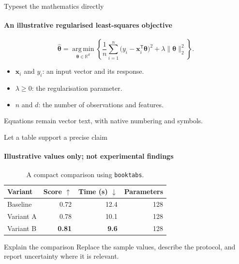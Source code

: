 \documentclass[aspectratio=169,11pt,t]{beamer}
\begin{document}
\begin{frame}{Typeset the mathematics directly}
  \framesubtitle{An illustrative regularised least-squares objective}
  \begin{equation}
    \widehat{\boldsymbol{\theta}}
      = \operatorname*{arg\,min}_{\boldsymbol{\theta}\in\mathbb{R}^{d}}
      \left\{
        \frac{1}{n}\sum_{i=1}^{n}
        \bigl(y_i-\mathbf{x}_i^{\mathsf T}\boldsymbol{\theta}\bigr)^2
        + \lambda\lVert\boldsymbol{\theta}\rVert_2^2
      \right\}.
  \end{equation}
  \begin{itemize}
    \item $\mathbf{x}_i$ and $y_i$: an input vector and its response.
    \item $\lambda\geq0$: the regularisation parameter.
    \item $n$ and $d$: the number of observations and features.
  \end{itemize}
  \smallskip
  {\small Equations remain vector text, with native numbering and symbols.}
\end{frame}

\begin{frame}{Let a table support a precise claim}
  \framesubtitle{Illustrative values only; not experimental findings}
  \begin{table}
    \centering
    \renewcommand{\arraystretch}{1.2}
    \begin{tabular}{lrrr}
      \toprule
      Variant & Score $\uparrow$ & Time (s) $\downarrow$ & Parameters \\
      \midrule
      Baseline & 0.72 & 12.4 & 128 \\
      Variant A & 0.78 & 10.1 & 128 \\
      Variant B & \textbf{0.81} & \textbf{9.6} & 128 \\
      \bottomrule
    \end{tabular}
    \caption{A compact comparison using \texttt{booktabs}.}
  \end{table}
  \begin{block}{Explain the comparison}
    Replace the sample values, describe the protocol, and report uncertainty
    where it is relevant.
  \end{block}
\end{frame}
\end{document}
